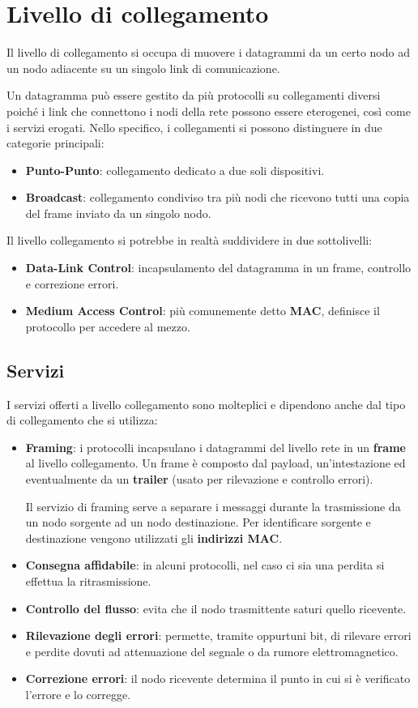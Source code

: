 \chapter{Livello di collegamento}
Il livello di collegamento si occupa di muovere i datagrammi da un certo
nodo ad un nodo adiacente su un singolo link di comunicazione.

Un datagramma può essere gestito da più protocolli su collegamenti 
diversi poiché i link che connettono i nodi della rete possono essere
eterogenei, così come i servizi erogati. Nello specifico, i collegamenti
si possono distinguere in due categorie principali:
\begin{itemize}
	\item \textbf{Punto-Punto}: collegamento dedicato a due soli 
		dispositivi.
	\item \textbf{Broadcast}: collegamento condiviso tra più nodi che 
		ricevono tutti una copia del frame inviato da un singolo nodo.
\end{itemize}
Il livello collegamento si potrebbe in realtà suddividere in due 
sottolivelli:
\begin{itemize}
	\item \textbf{Data-Link Control}: incapsulamento del datagramma in
		un frame, controllo e correzione errori.
	\item \textbf{Medium Access Control}: più comunemente detto 
		\textbf{MAC}, definisce il protocollo per accedere al mezzo.
\end{itemize}

\section{Servizi}
I servizi offerti a livello collegamento sono molteplici e dipendono
anche dal tipo di collegamento che si utilizza:
\begin{itemize}
	\item \textbf{Framing}: i protocolli incapsulano i datagrammi del
		livello rete in un \textbf{frame} al livello collegamento. Un 
		frame è composto dal payload, un'intestazione ed eventualmente
		da un \textbf{trailer} (usato per rilevazione e controllo 
		errori).

		Il servizio di framing serve a separare i messaggi durante la
		trasmissione da un nodo sorgente ad un nodo destinazione. Per
		identificare sorgente e destinazione vengono utilizzati gli
		\textbf{indirizzi MAC}.
	\item \textbf{Consegna affidabile}: in alcuni protocolli, nel caso
		ci sia una perdita si effettua la ritrasmissione.
	\item \textbf{Controllo del flusso}: evita che il nodo trasmittente
		saturi quello ricevente.
	\item \textbf{Rilevazione degli errori}: permette, tramite oppurtuni
		bit, di rilevare errori e perdite dovuti ad attenuazione del 
		segnale o da rumore elettromagnetico.
	\item \textbf{Correzione errori}: il nodo ricevente determina il
		punto in cui si è verificato l'errore e lo corregge.
\end{itemize}

